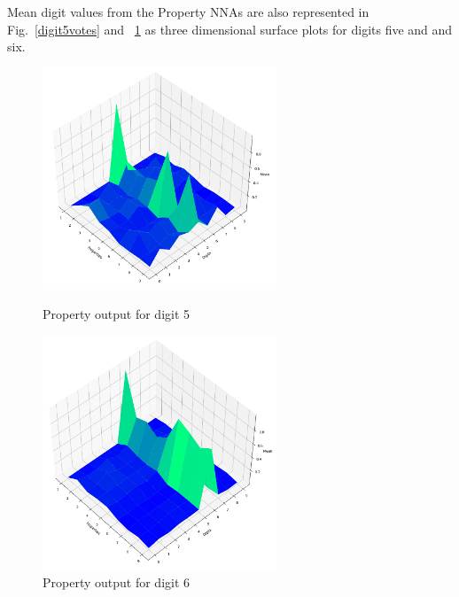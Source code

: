 \documentclass[conference]{IEEEtran}
\begin{document}
Mean digit values from the Property NNAs are also represented  in Fig.~\ref{digit5votes} and ~\ref{digit6votes} as three dimensional surface plots for digits five and  and six.

\begin{figure}[htbp]
\begin{minipage}{0.48\textwidth}
\centerline{\includegraphics[width=70mm]{./images/digit-5.png}}
\caption{Property output for digit 5}
\label{digit5votes}
\end{minipage}
\begin{minipage}{0.48\textwidth}
\centerline{\includegraphics[width=70mm]{./images/digit-6.png}}
\caption{Property output for digit 6}
\label{digit6votes}
\end{minipage}
\end{figure}
\end{document}
